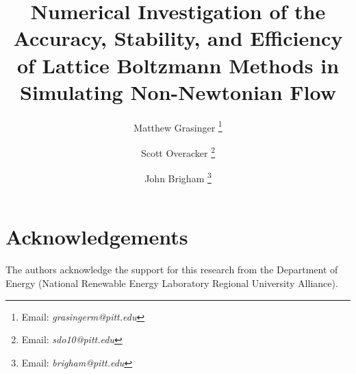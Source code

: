 \documentclass{article}
\title{Numerical Investigation of the Accuracy, Stability, and Efficiency of Lattice Boltzmann Methods in Simulating Non-Newtonian Flow}
\author{{Matthew Grasinger}
\thanks{Email: \textit{grasingerm@pitt.edu}}}
\author{{Scott Overacker}
\thanks{Email: \textit{sdo10@pitt.edu}}}
\author{John Brigham
\thanks{Email: \textit{brigham@pitt.edu}}}
\affil{Civil and Environmental Engineering Department, University of Pittsburgh}
\begin{document}
\maketitle
\newpage
{}



\section*{Acknowledgements}

The authors acknowledge the support for this research from the Department of Energy (National Renewable Energy Laboratory Regional University Alliance).



	
\end{document}
